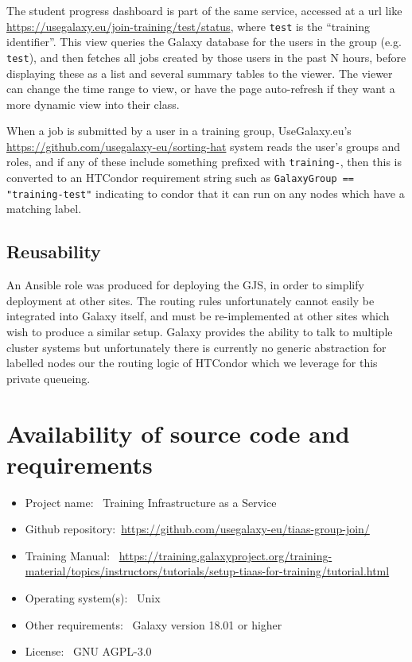 \documentclass[a4paper,num-refs]{oup-contemporary}
\begin{document}
The student progress dashboard is part of the same service, accessed at a url like \url{https://usegalaxy.eu/join-training/test/status}, where \texttt{test} is the ``training identifier''. This view queries the Galaxy database for the users in the group (e.g. \texttt{test}), and then fetches all jobs created by those users in the past N hours, before displaying these as a list and several summary tables to the viewer. The viewer can change the time range to view, or have the page auto-refresh if they want a more dynamic view into their class.

When a job is submitted by a user in a training group, UseGalaxy.eu's \href{Sorting Hat}{https://github.com/usegalaxy-eu/sorting-hat} system reads the user's groups and roles, and if any of these include something prefixed with \texttt{training-}, then this is converted to an HTCondor requirement string such as \texttt{GalaxyGroup == "training-test"} indicating to condor that it can run on any nodes which have a matching label.

\subsection{Reusability}
An Ansible role was produced for deploying the GJS, in order to simplify deployment at other sites. The routing rules unfortunately cannot easily be integrated into Galaxy itself, and must be re-implemented at other sites which wish to produce a similar setup. Galaxy provides the ability to talk to multiple cluster systems but unfortunately there is currently no generic abstraction for labelled nodes our the routing logic of HTCondor which we leverage for this private queueing.

\section{Availability of source code and requirements}

\begin{itemize}
\item Project name: ~Training Infrastructure as a Service
\item Github repository:~\url{https://github.com/usegalaxy-eu/tiaas-group-join/}
\item Training Manual: ~\url{https://training.galaxyproject.org/training-material/topics/instructors/tutorials/setup-tiaas-for-training/tutorial.html}
\item Operating system(s): ~Unix
\item Other requirements: ~Galaxy version 18.01 or higher
\item License: ~GNU AGPL-3.0
\end{itemize}
\end{document}
